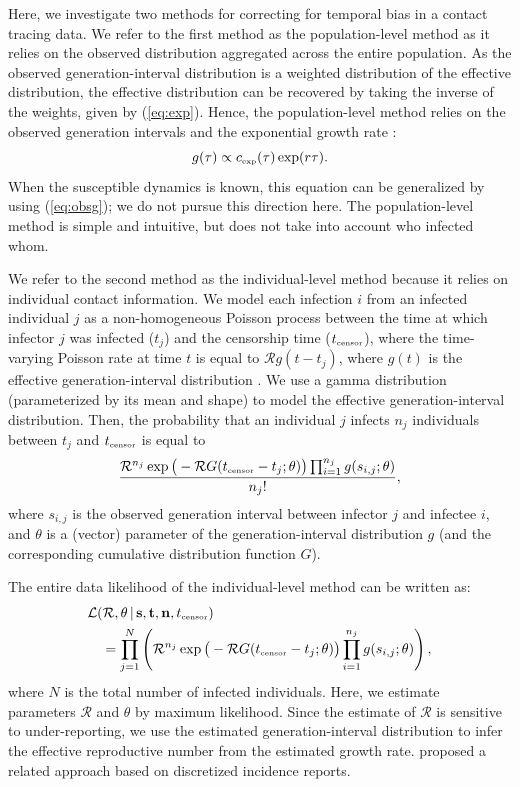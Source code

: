 \documentclass[12pt]{article}
\newcommand{\eref}[1]{(\ref{eq:#1})}
\newcommand{\RR}{\ensuremath{{\mathcal R}}}
\newcommand{\tsub}[2]{#1_{{\textrm{\tiny #2}}}}
\begin{document}
Here, we investigate two methods for correcting for temporal bias in a contact tracing data.
We refer to the first method as the population-level method as it relies on the observed distribution aggregated across the entire population.
As the observed generation-interval distribution is a weighted distribution of the effective distribution, the effective distribution can be recovered by taking the inverse of the weights, given by \eref{exp}.
Hence, the population-level method relies on the observed generation intervals and the exponential growth rate \citep{tomba2010some, nishiura2010time, britton2019estimation}:
\begin{equation}
g(\tau) \propto \tsub{c}{exp}(\tau) \exp(r\tau).
\end{equation}
When the susceptible dynamics is known, this equation can be generalized by using \eref{obsg}; we do not pursue this direction here.
The population-level method is simple and intuitive, but does not take into account who infected whom.

We refer to the second method as the individual-level method because it relies on individual contact information.
We model each infection $i$ from an infected individual $j$ as a non-homogeneous Poisson process between the time at which infector $j$ was infected ($t_j$) and the censorship time ($\tsub{t}{censor}$), where the time-varying Poisson rate at time $t$ is equal to $\RR g(t - t_j)$, where $g(t)$ is the effective generation-interval distribution \citep{daley2007introduction}.
We use a gamma distribution (parameterized by its mean and shape) to model the effective generation-interval distribution.
Then, the probability that an individual $j$ infects $n_j$ individuals between $t_j$ and $\tsub{t}{censor}$ is equal to
\begin{equation}
\frac{\RR^{n_j} \exp \big(- \RR G(\tsub{t}{censor} - t_j ;\theta) \big) \prod_{i=1}^{n_j} g(s_{i, j}; \theta)}{n_j!},
\end{equation}
where $s_{i,j}$ is the observed generation interval between infector $j$ and infectee $i$, and $\theta$ is a (vector) parameter of the generation-interval distribution $g$ (and the corresponding cumulative distribution function $G$).

The entire data likelihood of the individual-level method can be written as:
\begin{equation}
\begin{aligned}
&\mathcal{L}(\RR, \theta\,|\, \mathbf{s}, \mathbf{t}, \mathbf{n}, \tsub{t}{censor})\\
&\quad=\prod_{j=1}^N \left(\RR^{n_j} \exp \big(- \RR G(\tsub{t}{censor} - t_j ;\theta) \big) \prod_{i=1}^{n_j} g(s_{i, j}; \theta) \right),
\end{aligned}
\end{equation}
where $N$ is the total number of infected individuals.
Here, we estimate parameters $\RR$ and $\theta$ by maximum likelihood.
Since the estimate of $\RR$ is sensitive to under-reporting, we use the estimated generation-interval distribution to infer the effective reproductive number from the estimated growth rate.
\cite{forsberg2008likelihood} proposed a related approach based on discretized incidence reports.
\end{document}

